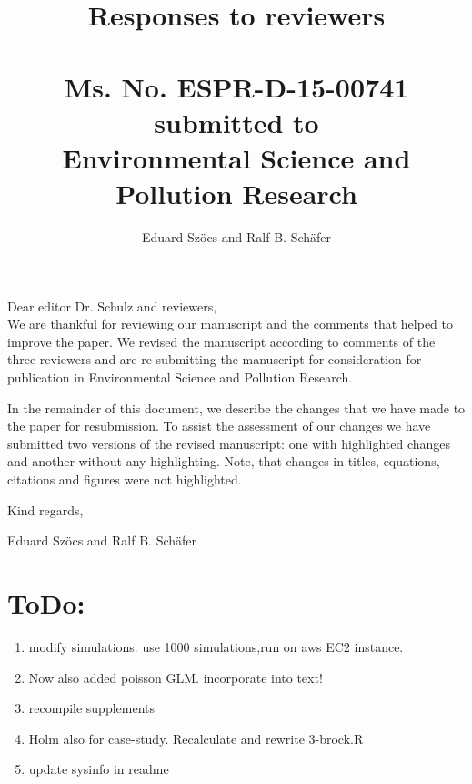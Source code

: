 \documentclass[12pt]{article}
\begin{document}
\title{Responses to reviewers\\~\\Ms. No. ESPR-D-15-00741\\submitted to\\Environmental Science and Pollution Research}

\author{Eduard Szöcs and Ralf B. Schäfer}

\maketitle
\noindent Dear editor Dr. Schulz  and reviewers,\\

We are thankful for reviewing our manuscript and the comments that helped to improve the paper. 
We revised the manuscript according to comments of the three reviewers and are re-submitting the manuscript for consideration for publication in Environmental Science and Pollution Research. 

In the remainder of this document, we describe the changes that we have made to the paper for resubmission. 
To assist the assessment of our changes we have submitted two versions of the revised manuscript: one with highlighted changes and another without any highlighting. 
Note, that changes in titles, equations, citations and figures were not highlighted.

\vspace{2em}
\hfill Kind regards,

\hfill Eduard Szöcs and Ralf B. Schäfer

\newpage
\section{ToDo:}
\begin{enumerate}
	\item modify simulations: use 1000 simulations,run on aws EC2 instance.
	\item Now also added poisson GLM. incorporate into text!
	\item recompile supplements
	\item Holm also for case-study. Recalculate and rewrite 3-brock.R
	\item update sysinfo in readme
\end{enumerate}


\end{document}
